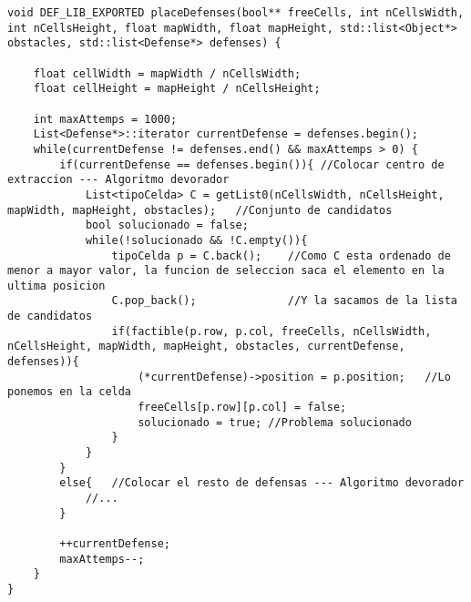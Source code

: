 \begin{lstlisting}
void DEF_LIB_EXPORTED placeDefenses(bool** freeCells, int nCellsWidth, int nCellsHeight, float mapWidth, float mapHeight, std::list<Object*> obstacles, std::list<Defense*> defenses) {

    float cellWidth = mapWidth / nCellsWidth;
    float cellHeight = mapHeight / nCellsHeight;

    int maxAttemps = 1000;
    List<Defense*>::iterator currentDefense = defenses.begin();
    while(currentDefense != defenses.end() && maxAttemps > 0) {
        if(currentDefense == defenses.begin()){ //Colocar centro de extraccion --- Algoritmo devorador
            List<tipoCelda> C = getList0(nCellsWidth, nCellsHeight, mapWidth, mapHeight, obstacles);   //Conjunto de candidatos
            bool solucionado = false;
            while(!solucionado && !C.empty()){
                tipoCelda p = C.back();    //Como C esta ordenado de menor a mayor valor, la funcion de seleccion saca el elemento en la ultima posicion
                C.pop_back();              //Y la sacamos de la lista de candidatos
                if(factible(p.row, p.col, freeCells, nCellsWidth, nCellsHeight, mapWidth, mapHeight, obstacles, currentDefense, defenses)){
                    (*currentDefense)->position = p.position;   //Lo ponemos en la celda
                    freeCells[p.row][p.col] = false;
                    solucionado = true; //Problema solucionado
                }
            }
        }
        else{   //Colocar el resto de defensas --- Algoritmo devorador
            //...
        }

        ++currentDefense;
        maxAttemps--;
    }
}
\end{lstlisting}
